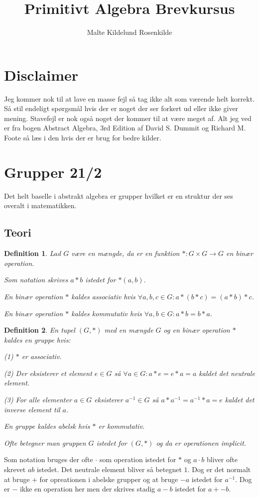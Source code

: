 \documentclass{article}
\title{Primitivt Algebra Brevkursus}
\author{Malte Kildelund Rosenkilde}
\newcommand{\inv}{^{-1}}
\newcommand{\too}{\rightarrow}
\newtheorem{defi}{Definition}
\begin{document}
	\maketitle
	\newpage

	\section*{Disclaimer}
		Jeg kommer nok til at lave en masse fejl så tag ikke alt som værende helt
		korrekt. Så stil endeligt spørgsmål hvis der er noget der ser forkert ud
		eller ikke giver mening.
		Stavefejl er nok også noget der kommer til at være meget af.
		Alt jeg ved er fra bogen
		Abstract Algebra, 3rd Edition af David S. Dummit og Richard M. Foote
		så læs i den hvis der er brug for bedre kilder.
	\section*{Grupper 21/2}
		Det helt baselle i abstrakt algebra er grupper hvilket er en struktur der
		ses overalt i matematikken.
		\subsection*{Teori}
		\begin{defi}
			Lad $G$ være en mængde, da er en funktion $*: G \times G \too G$
			en binær operation.

			Som notation skrives $a*b$ istedet for $*(a,b)$.

			En binær operation $*$ kaldes associativ hvis
			$\forall a,b,c \in G: a*(b*c) = (a*b)*c$.

			En binær operation $*$ kaldes kommutativ hvis
			$\forall a,b \in G: a*b = b*a$.
		\end{defi}
		\begin{defi}
			En tupel $(G,*)$ med en mængde $G$ og en binær operation $*$ kaldes
			en gruppe hvis:

			(1) $*$ er associativ.

			(2) Der eksisterer et element $e \in G$ så $\forall a \in G: a*e=e*a=a$
			kaldet det neutrale element.

			(3) For alle elementer $a \in G$ eksisterer $a\inv \in G$ så
			$a*a\inv = a\inv*a = e$ kaldet det inverse element til $a$.

			En gruppe kaldes abelsk hvis $*$ er kommutativ.

			Ofte betegner man gruppen $G$ istedet for $(G,*)$ og
			da er operationen implicit.
		\end{defi}
		Som notation bruges der ofte $\cdot$ som operation istedet for $*$ og
		$a\cdot b$ bliver ofte skrevet $ab$ istedet. Det neutrale element bliver så
		betegnet $1$. Dog er det normalt at bruge
		$+$ for opreationen i abelske grupper og at bruge $-a$ istedet for $a\inv$.
		Dog er $-$ ikke en operation her men der skrives stadig $a-b$ istedet for $a+-b$.
\end{document}
